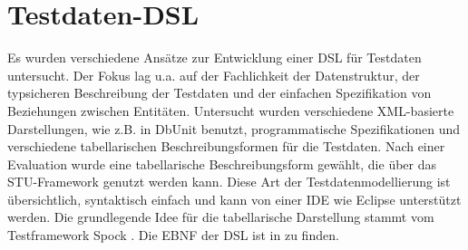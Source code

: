 \section{Testdaten-DSL}


%
%

Es wurden verschiedene Ansätze zur Entwicklung einer DSL für Testdaten untersucht. Der Fokus lag u.a. auf der Fachlichkeit der Datenstruktur, der typsicheren Beschreibung der Testdaten und der einfachen Spezifikation von Beziehungen zwischen Entitäten. Untersucht wurden verschiedene XML-basierte Darstellungen, wie z.B. in DbUnit benutzt, programmatische Spezifikationen und verschiedene tabellarischen Beschreibungsformen für die Testdaten. 
%
Nach einer Evaluation wurde eine tabellarische Beschreibungsform gewählt, die über das STU-Framework genutzt werden kann. Diese Art der Testdatenmodellierung ist übersichtlich, syntaktisch einfach und kann von einer IDE wie Eclipse unterstützt werden. Die grundlegende Idee für die tabellarische Darstellung stammt vom Testframework Spock \cite{Spock}.
%
Die EBNF der DSL ist in \cite{MT:Moll:2013} zu finden.



